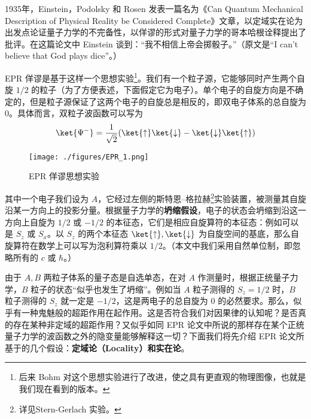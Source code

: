 
1935年，Einstein，Podolsky 和 Rosen 发表一篇名为《Can Quantum Mechanical Description of Physical Reality be Considered Complete》文章，以定域实在论为出发点论证量子力学的不完备性，以佯谬的形式对量子力学的哥本哈根诠释提出了批评。在这篇论文中 Einstein 谈到：“我不相信上帝会掷骰子。”（原文是“I can't believe that God plays dice”。） 

EPR 佯谬是基于这样一个思想实验\footnote{后来 Bohm 对这个思想实验进行了改进，使之具有更直观的物理图像，也就是我们现在看到的版本。}。我们有一个粒子源，它能够同时产生两个自旋 $1/2$ 的粒子（为了方便表述，下面假定它为电子）。单个电子的自旋方向是不确定的，但是粒子源保证了这两个电子的自旋总是相反的，即双电子体系的总自旋为 $0$。具体而言，双粒子波函数可以写为
\begin{equation}
\ket{\Psi^-}=\frac{1}{\sqrt{2}}(\ket{\uparrow}\ket{\downarrow}-\ket{\downarrow}\ket{\uparrow})
\end{equation}

\begin{figure}[ht]
\centering
\texttt{[image: ./figures/EPR\_1.png]}
\caption{EPR 佯谬思想实验} \label{EPR_fig1}
\end{figure}

其中一个电子我们设为 $A$，它经过左侧的斯特恩–格拉赫\footnote{详见Stern-Gerlach 实验。}实验装置，被测量其自旋沿某一方向上的投影分量。根据量子力学的\textbf{坍缩假设}，电子的状态会坍缩到沿这一方向上自旋为 $1/2$ 或 $-1/2$ 的本征态，它们是相应自旋算符的本征态：例如可以是 $S_z$ 或 $S_x$。以 $S_z$ 的两个本征态 $\ket{\uparrow},\ket{\downarrow}$ 为自旋空间的基底，那么自旋算符在数学上可以写为泡利算符乘以 $1/2$。（本文中我们采用自然单位制，即忽略所有的 $c$ 或 $\hbar$。）

由于 $A,B$ 两粒子体系的量子态是自选单态，在对 $A$ 作测量时，根据正统量子力学，$B$ 粒子的状态“似乎也发生了坍缩”。例如当 $A$ 粒子测得的 $S_z=1/2$ 时，$B$ 粒子测得的 $S_z$ 就一定是 $-1/2$，这是两电子的总自旋为 $0$ 的必然要求。那么，似乎有一种鬼魅般的超距作用在起作用。这是否符合我们对因果律的认知呢？是否真的存在某种非定域的超距作用？又似乎如同 EPR 论文中所说的那样存在某个正统量子力学的波函数之外的隐变量能够解释这一切？下面我们将先介绍 EPR 论文所基于的几个假设：\textbf{定域论（Locality）和实在论}。

